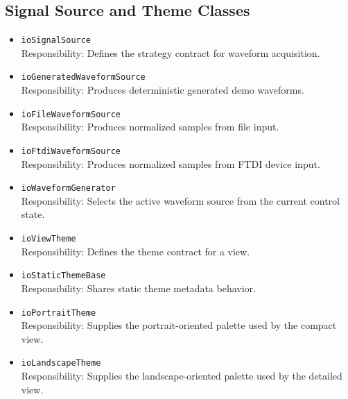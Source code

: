     \subsection{Signal Source and Theme Classes}
    \begin{itemize}
        \item \texttt{ioSignalSource} \\
        Responsibility: Defines the strategy contract for waveform acquisition.

        \item \texttt{ioGeneratedWaveformSource} \\
        Responsibility: Produces deterministic generated demo waveforms.

        \item \texttt{ioFileWaveformSource} \\
        Responsibility: Produces normalized samples from file input.

        \item \texttt{ioFtdiWaveformSource} \\
        Responsibility: Produces normalized samples from FTDI device input.

        \item \texttt{ioWaveformGenerator} \\
        Responsibility: Selects the active waveform source from the current control state.

        \item \texttt{ioViewTheme} \\
        Responsibility: Defines the theme contract for a view.

        \item \texttt{ioStaticThemeBase} \\
        Responsibility: Shares static theme metadata behavior.

        \item \texttt{ioPortraitTheme} \\
        Responsibility: Supplies the portrait-oriented palette used by the compact view.

        \item \texttt{ioLandscapeTheme} \\
        Responsibility: Supplies the landscape-oriented palette used by the detailed view.
    \end{itemize}

